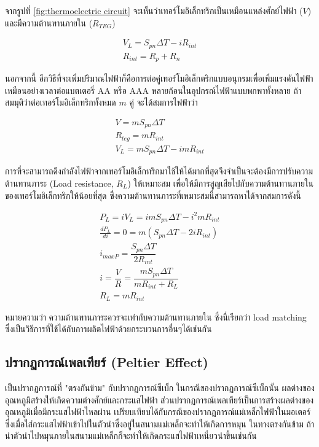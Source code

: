 \documentclass[11pt]{article}
\begin{document}
จากรูปที่ \ref{fig:thermoelectric circuit} จะเห็นว่าเทอร์โมอิเล็กทริกเป็นเหมือนแหล่งศักย์ไฟฟ้า (\(V\)) และมีความต้านทานภายใน (\(R_{TEG}\)) 

\begin{gather}
  V_L = S_{pn}\Delta T - iR_{int} \\
  R_{int} = R_p + R_n
\end{gather}

นอกจากนี้ อีกวิธีที่จะเพิ่มปริมาณไฟฟ้าก็คือการต่อคู่เทอร์โมอิเล็กตริกแบบอนุกรมเพื่อเพิ่มแรงดันไฟฟ้า เหมือนอย่างเวลาต่อแบตเตอรี่ AA หรือ AAA หลายก้อนในอุปกรณ์ไฟฟ้าแบบพกพาทั้งหลาย ถ้าสมมุติว่าต่อเทอร์โมอิเล็กทริกทั้งหมด \(m\) คู่ จะได้สมการไฟฟ้าว่า

\begin{gather}
  V = m S_{pn} \Delta T \\
  R_{teg} = m R_{int} \\
  V_L = m S_{pn} \Delta T - i mR_{int}
\end{gather}

การที่จะสามารถดึงกำลังไฟฟ้าจากเทอร์โมอิเล็กทริกมาใช้ให้ได้มากที่สุดจึงจำเป็นจะต้องมีการปรับความต้านทานภาระ (Load resistance, \(R_L\)) ให้เหมาะสม เพื่อให้มีการสูญเสียไปกับความต้านทานภายในของเทอร์โมอิเล็กทริกให้น้อยที่สุด ซึ่งความต้านทานภาระที่เหมาะสมนี้สามารถหาได้จากสมการดังนี้

\begin{gather*}
  P_L = iV_L = i m S_{pn} \Delta T - i^2 m R_{int} \\
  \frac{d P_L}{d i } = 0 = m(S_{pn} \Delta T - 2 i R_{int}) \\
  i_{max P} = \dfrac{S_{pn} \Delta T}{2 R_{int}} \\
  i = \dfrac{V}{R} = \dfrac{ m S_{pn} \Delta T }{ m R_{int} + R_L } \\
  R_L = m R_{int}
\end{gather*}

หมายความว่า ความต้านทานภาระควรจะเท่ากับความต้านทานภายใน ซึ่งนี่เรียกว่า load matching ซึ่งเป็นวิธีการที่ใช้ได้กับการผลิตไฟฟ้าด้วยกระบวนการอื่นๆได้เช่นกัน

\subsection{ปรากฏการณ์เพลเทียร์ (Peltier Effect)}
\label{sec:org9c9337e}

เป็นปรากฏการณ์ที่ "ตรงกันข้าม" กับปรากฏการณ์ซีเบ็ก ในกรณีของปรากฏการณ์ซีเบ็กนั้น ผลต่างของอุณหภูมิสร้างให้เกิดความต่างศักย์และกระแสไฟฟ้า ส่วนปรากฏการณ์เพลเทียร์เป็นการสร้างผลต่างของอุณหภูมิเมื่อมีกระแสไฟฟ้าไหลผ่าน เปรียบเทียบได้กับกรณีของปรากฏการณ์แม่เหล็กไฟฟ้าในมอเตอร์ ซึ่งเมื่อใส่กระแสไฟฟ้าเข้าไปในตัวนำซึ่งอยู่ในสนามแม่เหล็กจะทำให้เกิดการหมุน ในทางตรงกันข้าม ถ้านำตัวนำไปหมุนภายในสนามแม่เหล็กก็จะทำให้เกิดกระแสไฟฟ้าเหนี่ยวนำขึ้นเช่นกัน
\end{document}
